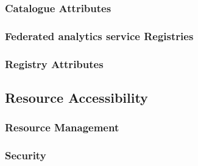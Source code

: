 \subsubsection{Catalogue Attributes}
\subsubsection{Federated analytics service Registries}
\subsubsection{Registry Attributes}

\subsection{Resource Accessibility}
\subsubsection{Resource Management}
\subsubsection{Security}

